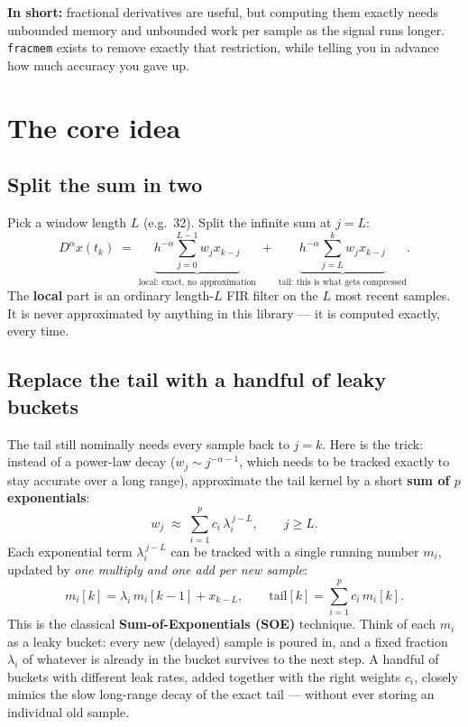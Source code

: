 \documentclass[11pt]{article}
\begin{document}
\begin{recap}
\textbf{In short:} fractional derivatives are useful, but computing them exactly needs unbounded memory and unbounded work per sample as the signal runs longer. \texttt{fracmem} exists to remove exactly that restriction, while telling you in advance how much accuracy you gave up.
\end{recap}

\section{The core idea}

\subsection{Split the sum in two}
Pick a window length $L$ (e.g.\ 32). Split the infinite sum at $j=L$:
\[
D^\alpha x(t_k) \;=\; \underbrace{h^{-\alpha}\!\!\sum_{j=0}^{L-1} w_j x_{k-j}}_{\text{local: exact, no approximation}} \;+\; \underbrace{h^{-\alpha}\!\!\sum_{j=L}^{k} w_j x_{k-j}}_{\text{tail: this is what gets compressed}}.
\]
The \textbf{local} part is an ordinary length-$L$ FIR filter on the $L$ most recent samples. It is never approximated by anything in this library --- it is computed exactly, every time.

\subsection{Replace the tail with a handful of leaky buckets}
The tail still nominally needs every sample back to $j=k$. Here is the trick: instead of a power-law decay ($w_j \sim j^{-\alpha-1}$, which needs to be tracked exactly to stay accurate over a long range), approximate the tail kernel by a short \textbf{sum of $p$ exponentials}:
\[
w_j \;\approx\; \sum_{i=1}^{p} c_i\, \lambda_i^{\,j-L}, \qquad j \ge L .
\]
Each exponential term $\lambda_i^{\,j-L}$ can be tracked with a single running number $m_i$, updated by \emph{one multiply and one add per new sample}:
\[
m_i[k] = \lambda_i\, m_i[k-1] + x_{k-L}, \qquad \text{tail}[k] = \sum_{i=1}^p c_i\, m_i[k].
\]
This is the classical \textbf{Sum-of-Exponentials (SOE)} technique. Think of each $m_i$ as a leaky bucket: every new (delayed) sample is poured in, and a fixed fraction $\lambda_i$ of whatever is already in the bucket survives to the next step. A handful of buckets with different leak rates, added together with the right weights $c_i$, closely mimics the slow long-range decay of the exact tail --- without ever storing an individual old sample.
\end{document}
